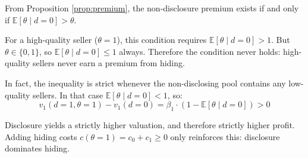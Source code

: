 From Proposition \ref{prop:premium}, the non-disclosure premium exists if and only if $\mathbb{E}[\theta \mid d=0] > \theta$.

For a high-quality seller ($\theta = 1$), this condition requires $\mathbb{E}[\theta \mid d=0] > 1$. But $\theta \in \{0, 1\}$, so $\mathbb{E}[\theta \mid d=0] \leq 1$ always. Therefore the condition never holds: high-quality sellers never earn a premium from hiding.

In fact, the inequality is strict whenever the non-disclosing pool contains any low-quality sellers. In that case $\mathbb{E}[\theta \mid d=0] < 1$, so:
\begin{equation}
    v_1(d=1, \theta=1) - v_1(d=0) = \beta_1 \cdot (1 - \mathbb{E}[\theta \mid d=0]) > 0
\end{equation}

Disclosure yields a strictly higher valuation, and therefore strictly higher profit. Adding hiding costs $c(\theta=1) = c_0 + c_1 \geq 0$ only reinforces this: disclosure dominates hiding.
